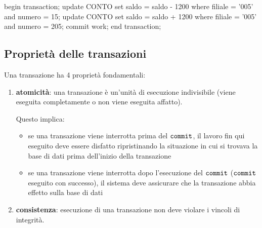 \begin{codiceSQL}
begin transaction;
  update CONTO set saldo = saldo - 1200
    where filiale = '005' and numero = 15;
  update CONTO set saldo = saldo + 1200
    where filiale = '005' and numero = 205;
  commit work;
end transaction;
\end{codiceSQL}

\subsection{Proprietà delle transazioni}
Una transazione ha 4 proprietà fondamentali:
\begin{enumerate}[itemsep=\smallskipamount]
  \item \textcolor{azzurrino}{\textbf{atomicità}}: una transazione è un'unità di esecuzione indivisibile (viene eseguita completamente o non viene eseguita affatto).
  
  Questo implica:
  \begin{itemize}[label=$\diamond$, itemsep=\smallskipamount]
    \item se una transazione viene interrotta prima del $\verb|commit|$, il lavoro fin qui eseguito deve essere disfatto ripristinando la situazione in cui si trovava la base di dati prima dell’inizio della transazione
    \item se una transazione viene interrotta dopo l’esecuzione del $\verb|commit|$ ($\verb|commit|$ eseguito con successo), il sistema deve assicurare che la transazione abbia effetto sulla base di dati
  \end{itemize}
  \item \textcolor{azzurrino}{\textbf{consistenza}}: esecuzione di una transazione non deve violare i vincoli di integrità.
  

\end{enumerate}

